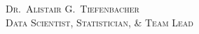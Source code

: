\documentclass[a4paper, oneside, final, 10pt]{scrartcl}
\begin{document}
{\centering
{\huge \textsc{Dr.~Alistair G.~Tiefenbacher}}\\
\textsc{Data Scientist, Statistician, \& Team Lead}
\vspace{0.2cm}
\par}




\vfill


% 

\vfill


\vfill


%

%

%

\vfill


\vspace{0.2cm}
\end{document}
